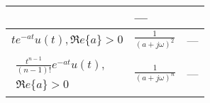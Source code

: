 \documentclass[12pt]{article}
\numberwithin{equation}{section}
\begin{document}
\begin{table}[htb]
\begin{center}
\begin{small}
\begin{tabular}{l|l|l}
  & \hspace{.25in} ---
  \\ \hline
$\displaystyle te^{-at}u(t), \Re e\{a\}>0$
  & $\displaystyle \frac{1}{(a+j\omega)^{2}}$
  & \hspace{.25in}---
  \\ \hline
$\displaystyle
  \begin{array}{c}
    \frac{t^{n-1}}{(n -1)!} e^{-at}u(t), \\
    \Re e\{a\}>0
  \end{array}$
  & $\displaystyle \frac{1}{(a + j\omega)^{n}}$
  & \hspace{.25in} ---
  \\ \hline
\end{tabular}
\end{small}
\end{center}
\end{table}
\clearpage

%
%
\end{document}
